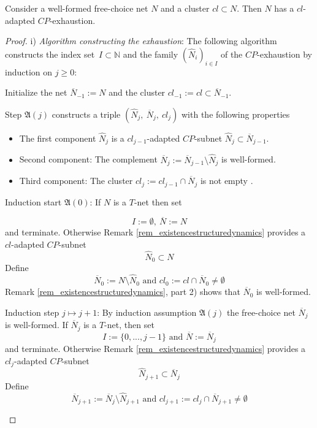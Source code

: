 \documentclass{fundam}
\begin{document}
\begin{theorem}\label{theor_existencecpexhaustion}
Consider a well-formed free-choice net $N$ and a cluster $cl \subset N$. Then $N$ has a $cl$-adapted $CP$-exhaustion.
\end{theorem}
\begin{proof}
i) \emph{Algorithm constructing the exhaustion}: The following algorithm constructs the index \mbox{set $I \subset \mathbb{N}$} and the family ${(\hat{N}_i)}_{i \in I}$ of the $CP$-exhaustion by induction on $j \geq 0$:
\begin{flushleft}
Initialize the net $\overline{N}_{-1}:=N$ and the cluster $cl_{-1}:=cl \subset \overline{N}_{-1}$.
\end{flushleft}
\begin{flushleft}
Step $\mathfrak{A}(j)$ constructs a triple $(\hat{N}_j,\ \overline{N}_j,\ cl_j)$ with the following properties
\end{flushleft}
\begin{itemize}
\item The first component $\hat{N}_{j}$ is a $cl_{j-1}$-adapted $CP$-subnet $\hat{N}_{j} \subset \overline{N}_{j-1}$.
\item Second component: The complement $\overline{N}_{j}:=\overline{N}_{j-1} \setminus \hat{N}_j$ is well-formed.
\item Third component: The cluster $cl_j:=cl_{j-1} \cap \overline{N}_j$ is not empty .
\end{itemize}
\begin{flushleft}
Induction start $\mathfrak{A}(0)$: If $N$ is a $T$-net then set
\end{flushleft}
$$I:=\emptyset,\ \overline{N}:=N$$
and terminate. Otherwise Remark \ref{rem_existencestructuredynamics} provides a $cl$-adapted $CP$-subnet
$$\hat{N}_0 \subset N$$
Define
$$\overline{N}_0:=N \setminus \hat{N}_0 \text{ and } cl_{0}:=cl \cap \overline{N}_0 \neq \emptyset$$
Remark \ref{rem_existencestructuredynamics}, part 2) shows that $\overline{N}_0$ is well-formed.
\begin{flushleft}
Induction step $j \mapsto j+1$: By induction assumption $\mathfrak{A}(j)$ the free-choice net $\overline{N}_{j}$ is well-formed. If $\overline{N}_{j}$ is a $T$-net, then set
$$I:=\{0,...,j-1\} \text{ and } \overline{N}:=\overline{N}_j$$
and terminate. Otherwise Remark \ref{rem_existencestructuredynamics} provides a $cl_j$-adapted $CP$-subnet
$$\hat{N}_{j+1} \subset \overline{N}_j$$
Define
$$\overline{N}_{j+1}:=\overline{N}_j\setminus \hat{N}_{j+1} \text{ and } cl_{j+1}:=cl_j \cap \overline{N}_{j+1} \neq \emptyset$$
\end{flushleft}


\end{proof}
\end{document}

